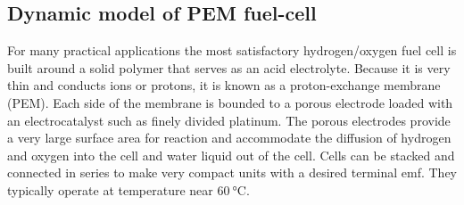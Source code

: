 \documentclass[12pt,a4paper]{scrartcl}
\begin{document}
\begin{onehalfspace}
\subsection{Dynamic model of PEM fuel-cell}
For many practical applications the most satisfactory hydrogen/oxygen fuel cell is built around a solid polymer that serves as an acid electrolyte. Because it is very thin and conducts  ions or protons, it is known as a proton-exchange membrane (PEM). Each side of the membrane is bounded to a porous electrode loaded with an electrocatalyst such as finely divided platinum. The porous electrodes provide a very large surface area for reaction and accommodate the diffusion of hydrogen and oxygen into the cell and water liquid out of the cell. Cells can be stacked and connected in series to make very compact units with a desired terminal emf. They typically operate at temperature near $\SI{60}{\celsius}$.


\end{onehalfspace}
\end{document}
